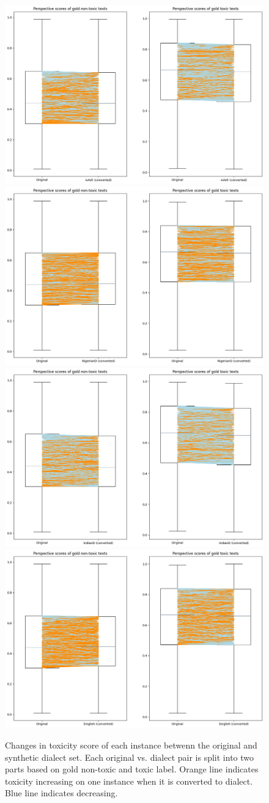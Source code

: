 \documentclass[11pt]{article}
\begin{document}
\begin{figure}[t]
  \includegraphics[width=0.48\linewidth]{figs-misc/AAVE-changes.png}\hfill
  \includegraphics[width=0.48\linewidth]{figs-misc/NigerianD-changes.png}\bigbreak
  \includegraphics[width=0.48\linewidth]{figs-misc/IndianD-changes.png}\hfill
  \includegraphics[width=0.48\linewidth]{figs-misc/Singlish-changes.png}
  \caption{Changes in toxicity score of each instance betwenn the original and synthetic dialect set. Each original vs. dialect pair is split into two parts based on gold non-toxic and toxic label. Orange line indicates toxicity increasing on one instance when it is converted to dialect. Blue line indicates decreasing.}
\end{figure}
\end{document}
